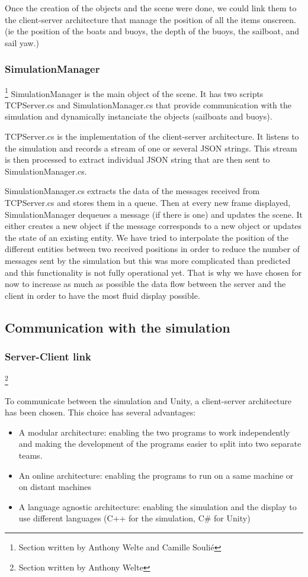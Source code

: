 \documentclass[a4paper]{report}
\begin{document}
Once the creation of the objects and the scene were done, we could link them to the client-server architecture that manage the position of all the items onscreen. (ie the position of the boats and buoys, the depth of the buoys, the sailboat, and sail yaw.)

\subsubsection{SimulationManager}
\footnote{Section written by Anthony Welte and Camille Soulié}
SimulationManager is the main object of the scene. It has two scripts TCPServer.cs and SimulationManager.cs that provide communication with the simulation and dynamically instanciate the objects (sailboats and buoys). 

TCPServer.cs is the implementation of the client-server architecture. It listens to the simulation and records a stream of one or several JSON strings. This stream is then processed to extract individual JSON string that are then sent to SimulationManager.cs.

SimulationManager.cs extracts the data of the messages received from TCPServer.cs and stores them in a queue. Then at every new frame displayed, SimulationManager dequeues a message (if there is one) and updates the scene. It either creates a new object if the message corresponds to a new object or updates the state of an existing entity. 
We have tried to interpolate the position of the different entities between two received positions in order to reduce the number of messages sent by the simulation but this was more complicated than predicted and this functionality is not fully operational yet. That is why we have chosen for now to increase as much as possible the data flow between the server and the client in order to have the most fluid display possible. %

\subsection{Communication with the simulation}
\subsubsection{Server-Client link}
\footnote{Section written by Anthony Welte}

To communicate between the simulation and Unity, a client-server architecture has been chosen. This choice has several advantages:
\begin{itemize}
\item A modular architecture: enabling the two programs to work independently and making the development of the programs easier to split into two separate teams.
\item An online architecture: enabling the programs to run on a same machine or on distant machines
\item A language agnostic architecture: enabling the simulation and the display to use different languages (C++ for the simulation, C\# for Unity)
\end{itemize}
\end{document}
